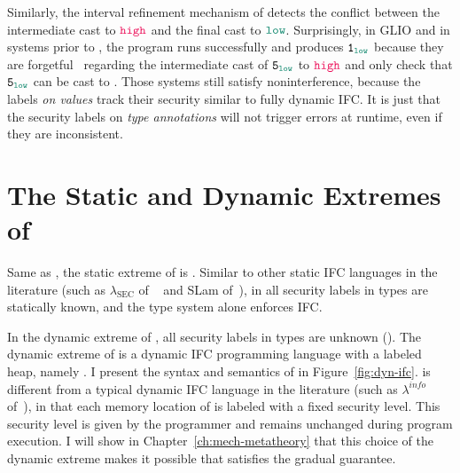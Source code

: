 Similarly, the interval refinement mechanism of \GSLRef detects the conflict
between the intermediate cast to $\high$ and the final cast to $\low$.
Surprisingly, in GLIO and in systems prior to \GSLRef \parencite{Disney:2011fv,
  Fennell:2013ab}, the program runs successfully and produces $\key{1}_{\low}$
because they are forgetful~\parencite{Greenberg:2014aa} regarding the
intermediate cast of $\key{5}_{\low}$ to $\high$ and only check that
$\key{5}_{\low}$ can be cast to \low. Those systems still satisfy
noninterference, because the labels \textit{on values} track their security
similar to fully dynamic IFC. It is just that the security labels on
\textit{type annotations} will not trigger errors at runtime, even if they are
inconsistent.

\section{The Static and Dynamic Extremes of \Surface}
\label{sec:embedding}

Same as \GSLRef, the static extreme of \Surface is \SSLRef. Similar to other
static IFC languages in the literature (such as $\lambda_{\text{SEC}}$ of
~\textcite{zdancewic2002programming} and SLam of~\textcite{heintze1998slam}), in
\SSLRef all security labels in types are statically known, and the type system
alone enforces IFC.

In the dynamic extreme of \GSLRef, all security labels in types are unknown
(\unk). The dynamic extreme of \GSLRef is a dynamic IFC programming language
with a labeled heap, namely \DynIFC. I present the syntax and semantics of
\DynIFC in Figure~\ref{fig:dyn-ifc}. \DynIFC is different from a typical dynamic
IFC language in the literature (such as $\lambda^{\textit{info}}$
of~\textcite{austin2009efficient}), in that each memory location of \DynIFC is
labeled with a fixed security level. This security level is given by the
programmer and remains unchanged during program execution. I will show in
Chapter~\ref{ch:mech-metatheory} that this choice of the dynamic extreme makes
it possible that \Surface satisfies the gradual guarantee.


